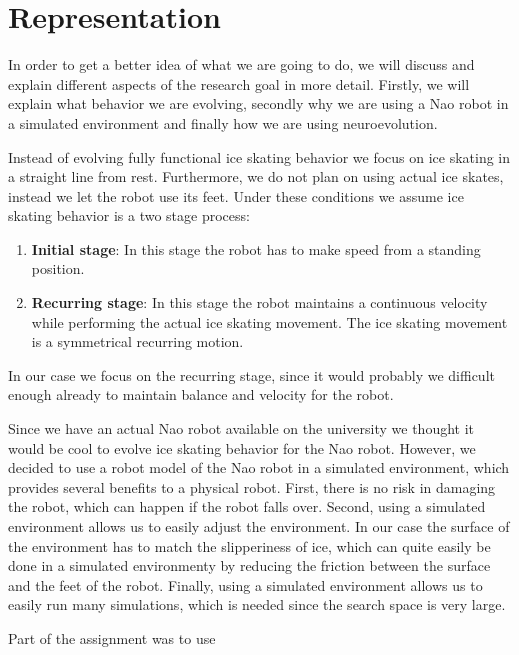 \documentclass[10pt]{article}
\begin{document}
\section{Representation}
\label{sec:representation}
In order to get a better idea of what we are going to do, we will discuss and explain different aspects of the research goal in more detail. Firstly, we will explain what behavior we are evolving, secondly why we are using a Nao robot in a simulated environment and finally how we are using neuroevolution.

Instead of evolving fully functional ice skating behavior we focus on ice skating in a straight line from rest. Furthermore, we do not plan on using actual ice skates, instead we let the robot use its feet. Under these conditions we assume ice skating behavior is a two stage process:
\begin{enumerate}
	\item \textbf{Initial stage}: In this stage the robot has to make speed from a standing position.
	\item \textbf{Recurring stage}: In this stage the robot maintains a continuous velocity while performing the actual ice skating movement. The ice skating movement is a symmetrical recurring motion.
\end{enumerate}

In our case we focus on the recurring stage, since it would probably we difficult enough already to maintain balance and velocity for the robot.

Since we have an actual Nao robot available on the university we thought it would be cool to evolve ice skating behavior for the Nao robot. However, we decided to use a robot model of the Nao robot in a simulated environment, which provides several benefits to a physical robot. First, there is no risk in damaging the robot, which can happen if the robot falls over. Second, using a simulated environment allows us to easily adjust the environment. In our case the surface of the environment has to match the slipperiness of ice, which can quite easily be done in a simulated environmenty by reducing the friction between the surface and the feet of the robot. Finally, using a simulated environment allows us to easily run many simulations, which is needed since the search space is very large.

Part of the assignment was to use
\end{document}
